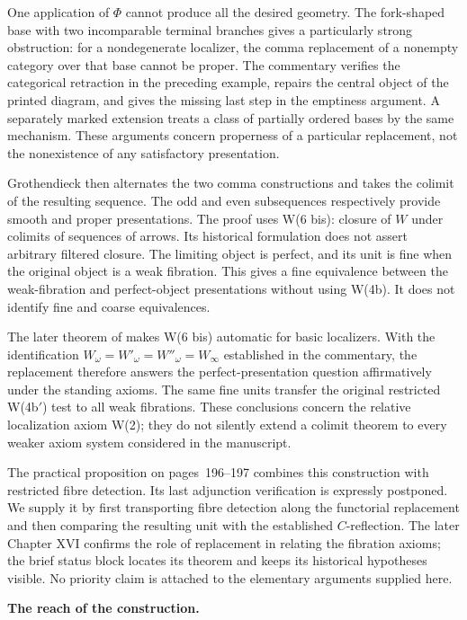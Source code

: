 One application of $\Phi$ cannot produce all the desired geometry. The fork-shaped base with two incomparable terminal branches gives a particularly strong obstruction: for a nondegenerate localizer, the comma replacement of a nonempty category over that base cannot be proper. The commentary verifies the categorical retraction in the preceding example, repairs the central object of the printed diagram, and gives the missing last step in the emptiness argument. A separately marked extension treats a class of partially ordered bases by the same mechanism. These arguments concern properness of a particular replacement, not the nonexistence of any satisfactory presentation.

Grothendieck then alternates the two comma constructions and takes the colimit of the resulting sequence. The odd and even subsequences respectively provide smooth and proper presentations. The proof uses W(6 bis): closure of $W$ under colimits of sequences of arrows. Its historical formulation does not assert arbitrary filtered closure. The limiting object is perfect, and its unit is fine when the original object is a weak fibration. This gives a fine equivalence between the weak-fibration and perfect-object presentations without using W(4b). It does not identify fine and coarse equivalences.

The later theorem of \citet[Corollary~4.2.22]{Cisinski2006} makes W(6 bis) automatic for basic localizers. With the identification $W_\omega=W'_\omega=W''_\omega=W_\infty$ established in the commentary, the replacement therefore answers the perfect-presentation question affirmatively under the standing axioms. The same fine units transfer the original restricted W(4b$'$) test to all weak fibrations. These conclusions concern the relative localization axiom W(2); they do not silently extend a colimit theorem to every weaker axiom system considered in the manuscript.

The practical proposition on pages~196--197 combines this construction with restricted fibre detection. Its last adjunction verification is expressly postponed. We supply it by first transporting fibre detection along the functorial replacement and then comparing the resulting unit with the established $C$-reflection. The later Chapter XVI confirms the role of replacement in relating the fibration axioms; the brief status block locates its theorem and keeps its historical hypotheses visible. No priority claim is attached to the elementary arguments supplied here.

\medskip\noindent\textbf{The reach of the construction.}

